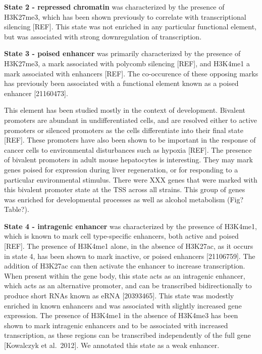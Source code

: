 \documentclass[10pt,letterpaper]{article}
\begin{document}
\textbf{State 2 - repressed chromatin} was characterized by the presence
of H3K27me3, which has been shown previously to correlate with
transcriptional silencing {[}REF{]}. This state was not enriched in any
particular functional element, but was associated with strong
downregulation of transcription.

\textbf{State 3 - poised enhancer} was primarily characterized by the
presence of H3K27me3, a mark associated with polycomb silencing
{[}REF{]}, and H3K4me1 a mark associated with enhancers {[}REF{]}. The
co-occurence of these opposing marks has previously been associated with
a functional element known as a poised enhancer {[}21160473{]}.

This element has been studied mostly in the context of development.
Bivalent promoters are abundant in undifferentiated cells, and are
resolved either to active promoters or silenced promoters as the cells
differentiate into their final state {[}REF{]}. These promoters have
also been shown to be important in the response of cancer cells to
environmental disturbances such as hypoxia {[}REF{]}. The presence of
bivalent promoters in adult mouse hepatocytes is interesting. They may
mark genes poised for expression during liver regeneration, or for
responding to a particular environmental stimulus. There were XXX genes
that were marked with this bivalent promoter state at the TSS across all
strains. This group of genes was enriched for developmental processes as
well as alcohol metabolism (Fig? Table?).

\textbf{State 4 - intragenic enhancer} was characterized by the presence
of H3K4me1, which is known to mark cell type-specific enhancers, both
active and poised {[}REF{]}. The presence of H3K4me1 alone, in the
absence of H3K27ac, as it occurs in state 4, has been shown to mark
inactive, or poised enhancers {[}21106759{]}. The addition of H3K27ac
can then activate the enhancer to increase transcription. When present
within the gene body, this state acts as an intragenic enhancer, which
acts as an alternative promoter, and can be transcribed bidirectionally
to produce short RNAs known as eRNA {[}20393465{]}. This state was
modestly enriched in known enhancers and was associated with slightly
increased gene expression. The presence of H3K4me1 in the absence of
H3K4me3 has been shown to mark intragenic enhancers and to be associated
with increased transcription, as these regions can be transcribed
independently of the full gene {[}Kowalczyk et al.~2012{]}. We annotated
this state as a weak enhancer.
\end{document}
